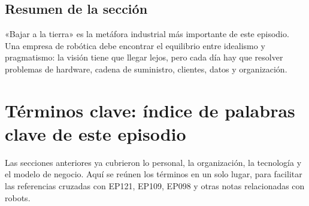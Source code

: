 \documentclass[a4paper]{article}
\begin{document}
\subsection{Resumen de la sección}

«Bajar a la tierra» es la metáfora industrial más importante de este episodio. Una empresa de robótica debe encontrar el equilibrio entre idealismo y pragmatismo: la visión tiene que llegar lejos, pero cada día hay que resolver problemas de hardware, cadena de suministro, clientes, datos y organización.
\section{Términos clave: índice de palabras clave de este episodio}

Las secciones anteriores ya cubrieron lo personal, la organización, la tecnología y el modelo de negocio. Aquí se reúnen los términos en un solo lugar, para facilitar las referencias cruzadas con EP121, EP109, EP098 y otras notas relacionadas con robots.
\end{document}
